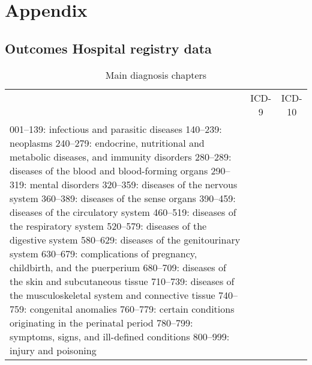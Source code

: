 \documentclass{scrartcl} %
\begin{document}
\newpage
\section{Appendix}
\subsection{Outcomes Hospital registry data}


\begin{table}[h] %
\begin{threeparttable}
\centering %
\caption{Main diagnosis chapters} %
\label{tab:outcomes_coding_main_chapters} 
\begin{tabular}{lrrr} %
\toprule %
&\multicolumn{2}{c}{ICD-9} & \multicolumn{1}{c}{ICD-10} \\ 
\cmidrule(lr){2 -3} \cmidrule(lr){4 -4}
	
 001–139: infectious and parasitic diseases
 140–239: neoplasms
 240–279: endocrine, nutritional and metabolic diseases, and immunity disorders
 280–289: diseases of the blood and blood-forming organs
 290–319: mental disorders
 320–359: diseases of the nervous system
 360–389: diseases of the sense organs
 390–459: diseases of the circulatory system
 460–519: diseases of the respiratory system
 520–579: diseases of the digestive system
 580–629: diseases of the genitourinary system
 630–679: complications of pregnancy, childbirth, and the puerperium
 680–709: diseases of the skin and subcutaneous tissue
 710–739: diseases of the musculoskeletal system and connective tissue
 740–759: congenital anomalies
 760–779: certain conditions originating in the perinatal period
 780–799: symptoms, signs, and ill-defined conditions
 800–999: injury and poisoning
 

\end{tabular}
\end{threeparttable}
\end{table}
\end{document}
